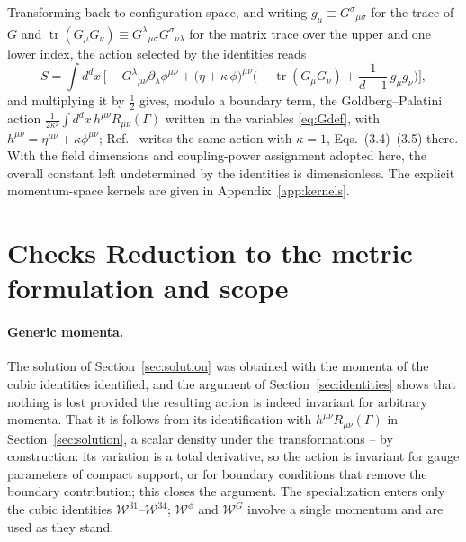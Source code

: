 \documentclass[prd,aps,preprint,superscriptaddress,nofootinbib,amsmath,amssymb,eqsecnum]{revtex4-2}
\newcommand{\W}{\mathcal{W}}
\providecommand{\DIFaddtex}[1]{{\protect\color{blue} \sf #1}} %
\providecommand{\DIFdeltex}[1]{{\protect\color{red} \scriptsize #1}} %
\providecommand{\DIFaddbegin}{} %
\providecommand{\DIFaddend}{} %
\providecommand{\DIFdelbegin}{} %
\providecommand{\DIFdelend}{} %
\providecommand{\DIFadd}[1]{\texorpdfstring{\DIFaddtex{#1}}{#1}} %
\providecommand{\DIFdel}[1]{\texorpdfstring{\DIFdeltex{#1}}{}} %
\begin{document}
Transforming back to configuration space, and writing $g_\mu\equiv G^{\sigma}{}_{\mu\sigma}$ for
the trace of $G$ and $\operatorname{tr}(G_\mu G_\nu)\equiv G^{\lambda}{}_{\mu\sigma}G^{\sigma}{}_{\nu\lambda}$
for the matrix trace over the upper and one lower index, the action selected by the identities reads
\begin{equation}
S=\int d^dx\,\Big[-G^{\lambda}{}_{\mu\nu}\partial_\lambda\phi^{\mu\nu}
+\big(\eta+\kappa\,\phi\big)^{\mu\nu}
\Big(-\operatorname{tr}(G_\mu G_\nu)+\frac{1}{d-1}\,g_\mu g_\nu\Big)\Big],
\label{eq:result}
\end{equation}
and multiplying it by $\tfrac12$ gives, modulo a boundary term, the Goldberg--Palatini action
$\frac{1}{2\kappa^2}\int d^dx\,h^{\mu\nu}R_{\mu\nu}(\Gamma)$ written in the variables
\eqref{eq:Gdef}, with $h^{\mu\nu}=\eta^{\mu\nu}+\kappa\phi^{\mu\nu}$; Ref.~\cite{BrandtMcKeon2016}
writes the same action with $\kappa=1$, Eqs.~(3.4)--(3.5) there. With the field dimensions
and coupling-power assignment adopted here, the overall constant left undetermined by the
identities is dimensionless.
The explicit momentum-space kernels are given in Appendix~\ref{app:kernels}.

\section{\DIFdelbegin \DIFdel{Checks }\DIFdelend \DIFaddbegin \DIFadd{Reduction to the metric formulation }\DIFaddend and scope}
\label{sec:checks}

\DIFdelbegin \paragraph{\DIFdel{Generic momenta.}} %
\addtocounter{paragraph}{-1}%
\DIFdel{The solution of Section~\ref{sec:solution} was obtained with
the momenta of the cubic identities identified, and the argument of
Section~\ref{sec:identities} shows that nothing is lost provided the resulting action is
indeed invariant for arbitrary momenta. That it is follows from its identification with
$h^{\mu\nu}R_{\mu\nu}(\Gamma)$ in Section~\ref{sec:solution}, a scalar density under the
transformations }%
\DIFdel{--}%
\DIFdel{by construction: its variation is a total
derivative, so the action is invariant for gauge parameters of compact support, or for
boundary conditions that remove the boundary contribution; this closes the argument. The
specialization enters only the cubic identities $\W^{31}$--$\W^{34}$; $\W^{\phi}$ and
$\W^{G}$ involve a single momentum and are used as they stand.
}%
\end{document}
